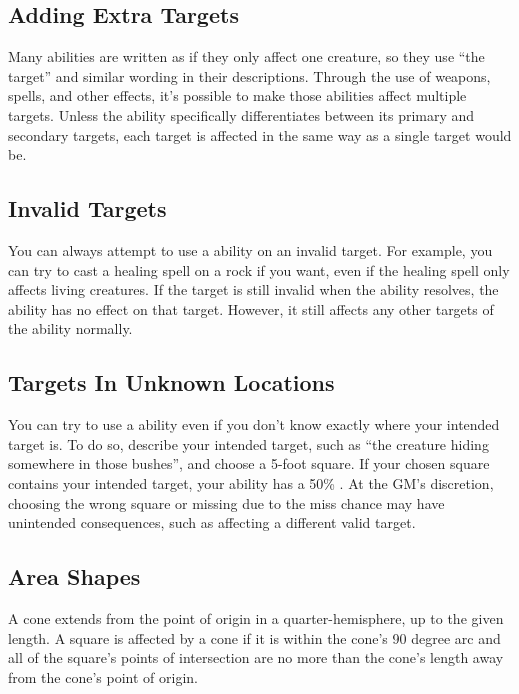     \subsection{Adding Extra Targets}
      Many abilities are written as if they only affect one creature, so they use ``the target'' and similar wording in their descriptions.
      Through the use of  weapons,  spells, and other effects, it's possible to make those abilities affect multiple targets.
      Unless the ability specifically differentiates between its primary and secondary targets, each target is affected in the same way as a single target would be.

    \subsection{Invalid Targets}
      You can always attempt to use a  ability on an invalid target.
      For example, you can try to cast a healing spell on a rock if you want, even if the healing spell only affects living creatures.
      If the target is still invalid when the ability resolves, the ability has no effect on that target.
      However, it still affects any other targets of the ability normally.

    \subsection{Targets In Unknown Locations}
      You can try to use a  ability even if you don't know exactly where your intended target is.
      To do so, describe your intended target, such as ``the creature hiding somewhere in those bushes'', and choose a 5-foot square.
      If your chosen square contains your intended target, your ability has a 50\% .
      At the GM's discretion, choosing the wrong square or missing due to the miss chance may have unintended consequences, such as affecting a different valid target.

  \subsection{Area Shapes}\label{Area Shapes}

     A cone extends from the point of origin in a quarter-hemisphere, up to the given length.
    A square is affected by a cone if it is within the cone's 90 degree arc and all of the square's points of intersection are no more than the cone's length away from the cone's point of origin.

